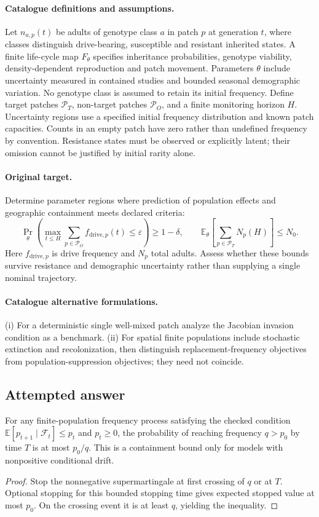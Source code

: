 \documentclass[11pt]{article}
\begin{document}
\paragraph{Catalogue definitions and assumptions.}
Let $n_{a,p}(t)$ be adults of genotype class $a$ in patch $p$ at generation $t$, where classes distinguish drive-bearing, susceptible and resistant inherited states. A finite life-cycle map $F_\theta$ specifies inheritance probabilities, genotype viability, density-dependent reproduction and patch movement. Parameters $\theta$ include uncertainty measured in contained studies and bounded seasonal demographic variation. No genotype class is assumed to retain its initial frequency. Define target patches $\mathcal P_T$, non-target patches $\mathcal P_O$, and a finite monitoring horizon $H$. Uncertainty regions use a specified initial frequency distribution and known patch capacities. Counts in an empty patch have zero rather than undefined frequency by convention. Resistance states must be observed or explicitly latent; their omission cannot be justified by initial rarity alone.
\paragraph{Original target.}
Determine parameter regions where prediction of population effects and geographic containment meets declared criteria:
\[
 \Pr_\theta\!\left(\max_{t\le H}\sum_{p\in\mathcal P_O}
 f_{\mathrm{drive},p}(t)\le\varepsilon\right)\ge1-\delta,
 \qquad
 \mathbb{E}_\theta\!\left[\sum_{p\in\mathcal P_T}N_p(H)\right]\le N_0.
\]
Here $f_{\mathrm{drive},p}$ is drive frequency and $N_p$ total adults. Assess whether these bounds survive resistance and demographic uncertainty rather than supplying a single nominal trajectory.
\paragraph{Catalogue alternative formulations.}
(i) For a deterministic single well-mixed patch analyze the Jacobian invasion condition as a benchmark. (ii) For spatial finite populations include stochastic extinction and recolonization, then distinguish replacement-frequency objectives from population-suppression objectives; they need not coincide.
\subsection{Attempted answer}
\begin{proposition}
For any finite-population frequency process satisfying the checked condition $\mathbb{E}[p_{t+1}\mid\mathcal F_t]\leq p_t$ and $p_t\geq0$, the probability of reaching frequency $q>p_0$ by time $T$ is at most $p_0/q$. This is a containment bound only for models with nonpositive conditional drift.
\end{proposition}
\begin{proof}
Stop the nonnegative supermartingale at first crossing of $q$ or at $T$. Optional stopping for this bounded stopping time gives expected stopped value at most $p_0$. On the crossing event it is at least $q$, yielding the inequality.
\end{proof}
\end{document}
